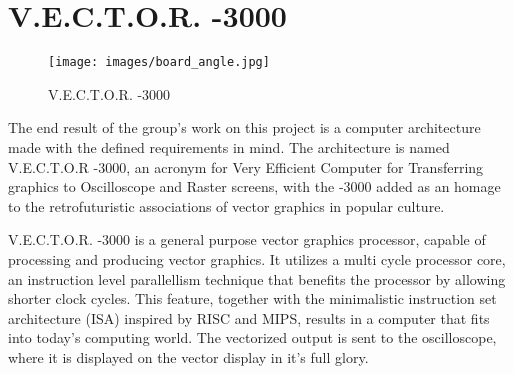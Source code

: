 \chapter{V.E.C.T.O.R. -3000}

\begin{figure}[H]
    \texttt{[image: images/board\_angle.jpg]}
    \caption{V.E.C.T.O.R. -3000}
    \label{fig:board-angle}
\end{figure}

The end result of the group's work on this project is a computer architecture made with the defined requirements in mind.
The architecture is named V.E.C.T.O.R -3000, an acronym for Very Efficient Computer for Transferring graphics to Oscilloscope and Raster screens, with the -3000 added as an homage to the retrofuturistic associations of vector graphics in popular culture.

V.E.C.T.O.R. -3000 is a general purpose vector graphics processor, capable of processing and producing vector graphics. 
It utilizes a multi cycle processor core, an instruction level parallellism technique that benefits the processor by allowing shorter clock cycles.
This feature, together with the minimalistic instruction set architecture (ISA) inspired by RISC\cite{} and MIPS\cite{}, results in a computer that fits into today's computing world.
The vectorized output is sent to the oscilloscope, where it is displayed on the vector display in it's full glory.